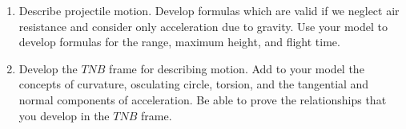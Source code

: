 

\begin{enumerate}
\item Describe projectile motion.  Develop formulas which are valid if
  we neglect air resistance and consider only acceleration due to
  gravity.  Use your model to develop formulas for the range, maximum
  height, and flight time.
\item Develop the $TNB$ frame for describing motion. Add to your model
  the concepts of curvature, osculating circle, torsion, and the
  tangential and normal components of acceleration. Be able to prove
  the relationships that you develop in the $TNB$ frame.
\end{enumerate}


